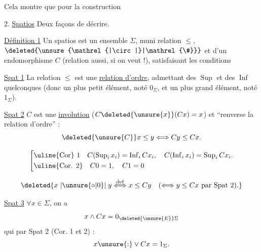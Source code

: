 Cela montre que pour la construction

2. \uline{Spatios} Deux façons de  décrire.

\uline{Définition 1} Un spatios est un ensemble $\Sigma$, muni   relation $\leq$, $\deleted{\unsure{\mathrel{|\circ|}|\mathrel{\#}}}$ et d'un endomorphisme $C$ (relation aussi, si on veut !), satisfaisant les conditions

\uline{Spat 1} La relation $\leq$ est une \uline{relation d'ordre}, admettant des $\operatorname{Sup}$ et des $\operatorname{Inf}$ quelconques (donc un plus petit élément, noté  $0_{\Sigma}$, et un plus grand élément, noté  $1_{\Sigma}$).

\uline{Spat 2} $C$ est une \uline{involution} ($C\deleted{\unsure{x}}(Cx)=x$) et  ``renverse la relation d'ordre'' :
\[
\deleted{\unsure{C}}x\leq y\Longleftrightarrow Cy\leq Cx.
\]

\[
\left[\begin{aligned}
&\text{\uline{Cor} 1}\quad C(\operatorname{Sup}_{i}x_{i})=\operatorname{Inf}_{i}Cx_{i},\quad C(\operatorname{Inf}_{i}x_{i})=\operatorname{Sup}_{i}Cx_{i}.\\
&\text{\uline{Cor. 2}}\quad C0=1,\quad C1=0
\end{aligned}\right.
\]

\[
\deleted{x\mathrel{|\unsure{\circ|0}|}y\mathrel{\overset{\mathrm{def}}{\Longleftrightarrow}}x\leq Cy\quad(\Longleftrightarrow y\leq Cx\ \text{par Spat 2}).}
\]

\uline{Spat 3} $\forall x\in\Sigma$, on a
\[
x\wedge Cx=0_{\deleted{\unsure{E}}\Sigma}
\]
 qui  par Spat 2 (Cor. 1 et 2) :
\[
x\unsure{:}\vee Cx=1_{\Sigma}.
\]
